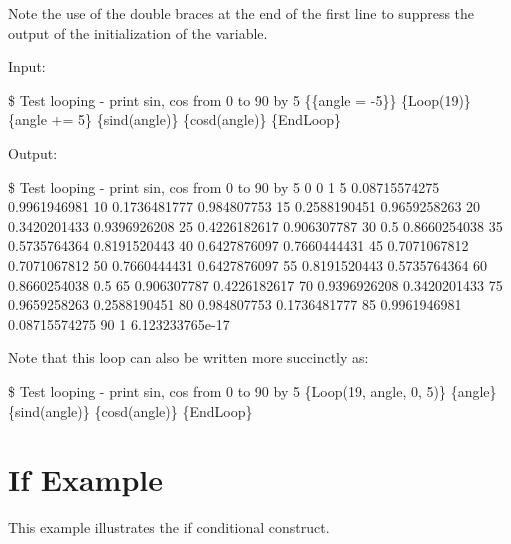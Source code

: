 Note the use of the double braces at the end of the first line to
suppress the output of the initialization of the  variable.

Input:
\begin{apinp}
\$  Test  looping  -  print  sin,  cos  from  0  to  90  by  5 \{\{angle  =  -5\}\}
\{Loop(19)\}
\{angle  +=  5\}  \{sind(angle)\}  \{cosd(angle)\}
\{EndLoop\}
\end{apinp}
Output:
\begin{apout}
\$  Test  looping  -  print  sin,  cos  from  0  to 90  by  5
 0  0    1
 5  0.08715574275 0.9961946981
10  0.1736481777  0.984807753
15  0.2588190451  0.9659258263
20  0.3420201433  0.9396926208
25  0.4226182617  0.906307787
30  0.5    0.8660254038
35  0.5735764364  0.8191520443
40  0.6427876097  0.7660444431
45  0.7071067812  0.7071067812
50  0.7660444431  0.6427876097
55  0.8191520443  0.5735764364
60  0.8660254038  0.5
65  0.906307787  0.4226182617
70  0.9396926208  0.3420201433
75  0.9659258263  0.2588190451
80  0.984807753  0.1736481777
85  0.9961946981  0.08715574275
90  1    6.123233765e-17
\end{apout}

Note that this loop can also be written more succinctly as:
\begin{apinp}
\$  Test  looping  -  print  sin,  cos  from  0  to  90  by  5
\{Loop(19, angle, 0, 5)\}
\{angle\}  \{sind(angle)\}  \{cosd(angle)\}
\{EndLoop\}
\end{apinp}

\section{If Example}
This example illustrates the if conditional construct.


